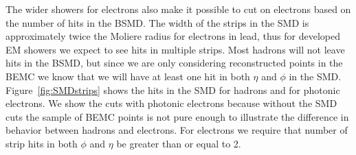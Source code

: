 The wider showers for electrons also make it possible to cut on electrons based on the number of hits in the BSMD. The width of the strips in the SMD is approximately twice the Moliere radius for electrons in lead, thus for developed EM showers we expect to see hits in multiple strips. Most hadrons will not leave hits in the BSMD, but since we are only considering reconstructed points in the BEMC we know that we will have at least one hit in both $\eta$ and $\phi$ in the SMD. Figure~\ref{fig:SMDstrips} shows the hits in the SMD for hadrons and for photonic electrons. We show the cuts with photonic electrons because without the SMD cuts the sample of BEMC points is not pure enough to illustrate the difference in behavior between hadrons and electrons. For electrons we require that number of strip hits in both $\phi$ and $\eta$ be greater than or equal to 2.

